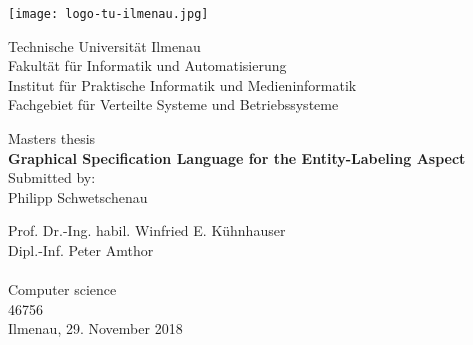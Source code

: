 \documentclass[twoside, openright, 12pt]{book}
\begin{document}
%
\begin{titlepage}
\newlength{\detailwidth}
\newlength{\detaildescriptionwidth}
\settowidth{\detailwidth}{Eingereicht:~~ Prof. Dr.-Ing. habil. Winfried E. Kühnhauser}
\settowidth{\detaildescriptionwidth}{Studies:~~} 
\begin{center}

\vfill {
	\texttt{[image: logo-tu-ilmenau.jpg]}
	\vspace{8ex}
}

\begin{normalsize}Technische Universität Ilmenau \\
Fakultät für Informatik und Automatisierung \\
Institut für Praktische Informatik und Medieninformatik \\
Fachgebiet für Verteilte Systeme und Betriebssysteme        
\end{normalsize}


\vfill {\large
	Masters thesis\\ \vspace{2ex}
	\LARGE \textbf{Graphical Specification Language for the Entity-Labeling Aspect} \\ \vspace{2.5ex} 
	\normalsize Submitted by: \\
	\Large Philipp Schwetschenau \\ \vspace{3ex} 
}
\vfill \parbox{\detailwidth}{
	 Prof. Dr.-Ing. habil. Winfried E. Kühnhauser \\
	 Dipl.-Inf. Peter Amthor \\
	\vspace{2ex} \\
	 Computer science\\  
	 46756  
	\vspace{2ex} \\
	 Ilmenau, 29. November 2018 
}
\vspace*{\fill}
\end{center}
\end{titlepage}

\mbox{}
\thispagestyle{empty}
\cleardoublepage

\setcounter{page}{1}
\tableofcontents
\end{document}
